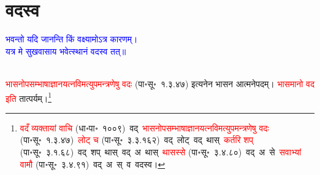 \section[वदस्व]{वदस्व}
\centering\textcolor{blue}{भवन्तो यदि जानन्ति किं वक्ष्यामोऽत्र कारणम्।\nopagebreak\\
यत्र मे सुखवासाय भवेत्स्थानं वदस्व तत्॥}\nopagebreak\\
\\
\fontsize{14}{21}\selectfont\begin{sloppypar}\justifying\noindent\hspace{10mm} \textcolor{red}{भासनोपसम्भाषा\-ज्ञान\-यत्न\-विमत्युपमन्त्रणेषु वदः} (पा॰सू॰~१.३.४७) इत्यनेन भासन आत्मनेपदम्। \textcolor{red}{भासमानो वद इति} तात्पर्यम्।\footnote{\textcolor{red}{वदँ व्यक्तायां वाचि} (धा॰पा॰~१००९)~\arrow वद्~\arrow \textcolor{red}{भासनोपसम्भाषा\-ज्ञान\-यत्न\-विमत्युपमन्त्रणेषु वदः} (पा॰सू॰~१.३.४७)~\arrow \textcolor{red}{लोट् च} (पा॰सू॰~३.३.१६२)~\arrow वद्~लोट्~\arrow वद्~थास्~\arrow \textcolor{red}{कर्तरि शप्} (पा॰सू॰~३.१.६८)~\arrow वद्~शप्~थास्~\arrow वद्~अ~थास्~\arrow \textcolor{red}{थासस्से} (पा॰सू॰~३.४.८०)~\arrow वद्~अ~से~\arrow \textcolor{red}{सवाभ्यां वामौ} (पा॰सू॰~३.४.९१)~\arrow वद्~अ~स्~व~\arrow वदस्व।}\end{sloppypar}
